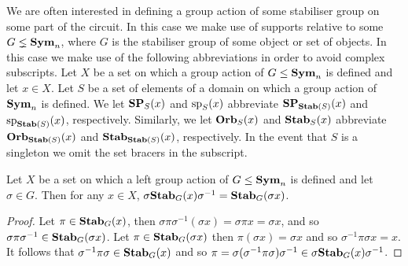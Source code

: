 \documentclass[../paper.tex]{subfiles}
\begin{document}
We are often interested in defining a group action of some stabiliser group on
some part of the circuit. In this case we make use of supports relative to some
$G \lneq \text{\textbf{Sym}}_n$, where $G$ is the stabiliser group of some object or set of
objects. In this case we make use of the following abbreviations in order to
avoid complex subscripts. Let $X$ be a set on which a group action of $G \leq
\text{\textbf{Sym}}_n$ is defined and let $x \in X$. Let $S$ be a set of elements of a domain
on which a group action of $\text{\textbf{Sym}}_n$ is defined. We let $\text{\textbf{SP}}_S(x)$ and
$\text{sp}_S(x)$ abbreviate $\text{\textbf{SP}}_{\text{\textbf{Stab}}(S)}(x)$ and $\text{sp}_{\text{\textbf{Stab}}(S)}(x)$,
respectively. Similarly, we let $\text{\textbf{Orb}}_S(x)$ and $\text{\textbf{Stab}}_S(x)$ abbreviate
$\text{\textbf{Orb}}_{\text{\textbf{Stab}}(S)}(x)$ and $\text{\textbf{Stab}}_{\text{\textbf{Stab}}(S)}(x)$, respectively. In the event that
$S$ is a singleton we omit the set bracers in the subscript.


\begin{lem}
  \label{lem:stab-conjugation}
  Let $X$ be a set on which a left group action of $G \leq \text{\textbf{Sym}}_n$ is defined
  and let $\sigma \in G$. Then for any $x \in X$, $\sigma \text{\textbf{Stab}}_G (x)
  \sigma^{-1} = \text{\textbf{Stab}}_G(\sigma x)$.
\end{lem}

\begin{proof}
  Let $\pi \in \text{\textbf{Stab}}_G(x)$, then $\sigma \pi \sigma^{-1}(\sigma x) = \sigma \pi
  x = \sigma x$, and so $\sigma \pi \sigma^{-1} \in \text{\textbf{Stab}}_G(\sigma x)$. Let $\pi
  \in \text{\textbf{Stab}}_G(\sigma x)$ then $\pi (\sigma x) = \sigma x$ and so $\sigma^{-1}
  \pi \sigma x = x$. It follows that $\sigma^{-1} \pi \sigma \in \text{\textbf{Stab}}_G(x)$ and
  so $\pi = \sigma (\sigma^{-1} \pi \sigma) \sigma ^{-1} \in \sigma \text{\textbf{Stab}}_G(x)
  \sigma^{-1}$.
\end{proof}
\end{document}
